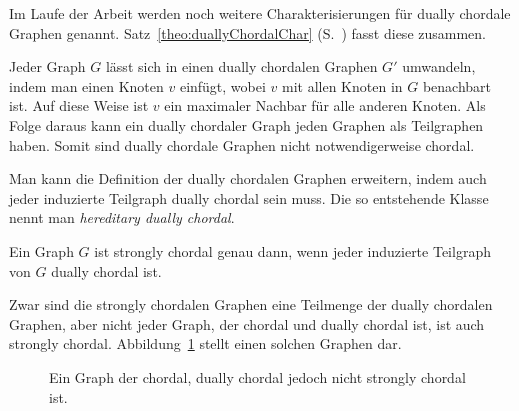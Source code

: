 Im Laufe der Arbeit werden noch weitere Charakterisierungen für dually chordale Graphen genannt. Satz~\ref{theo:duallyChordalChar} (S.~\pageref{theo:duallyChordalChar}) fasst diese zusammen.

Jeder Graph $G$ lässt sich in einen dually chordalen Graphen $G'$ umwandeln, indem man einen Knoten $v$ einfügt, wobei $v$ mit allen Knoten in $G$ benachbart ist. Auf diese Weise ist $v$ ein maximaler Nachbar für alle anderen Knoten. Als Folge daraus kann ein dually chordaler Graph jeden Graphen als Teilgraphen haben. Somit sind dually chordale Graphen nicht notwendigerweise chordal.

Man kann die Definition der dually chordalen Graphen erweitern, indem auch jeder induzierte Teilgraph dually chordal sein muss. Die so entstehende Klasse nennt man \emph{hereditary dually chordal}.

\begin{Theorem}\cite{duallyChordal}\label{theo:hereDuCh_strCh}
    Ein Graph $G$ ist strongly chordal genau dann, wenn jeder induzierte Teilgraph von $G$ dually chordal ist.
\end{Theorem}

Zwar sind die strongly chordalen Graphen eine Teilmenge der dually chordalen Graphen, aber nicht jeder Graph, der chordal und dually chordal ist, ist auch strongly chordal. Abbildung~\ref{pic:bsp_chDuCh_notStrCh} stellt einen solchen Graphen dar.

\begin{figure}[htbp]
    \centering
    \caption{Ein Graph der chordal, dually chordal jedoch nicht strongly chordal ist.}
    \label{pic:bsp_chDuCh_notStrCh}
\end{figure}


